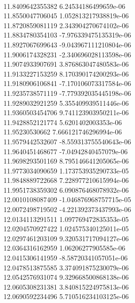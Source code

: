 { \\
11.8409642355382 6.24534186499659e-06
 \\
11.8550047706045 1.052813217938819e-06
 \\
11.8720859081119 2.343904270674102e-06
 \\
11.8834780354103 -7.976339475135319e-06
 \\
11.8927067699643 -9.043967111210804e-06
 \\
11.9006174328231 -2.340696028113598e-06
 \\
11.9074933907691 3.876863047480583e-06
 \\
11.9133227153259 8.170390174200293e-06
 \\
11.9180906106841 -7.170106073317584e-06
 \\
11.9235738571119 -7.779392035445198e-06
 \\
11.9289032921259 5.355409939511446e-06
 \\
11.9360503454706 9.741123903950211e-06
 \\
11.9428852121774 5.6201402003353e-06
 \\
11.95230530662 7.666121746296994e-06
 \\
11.9579442532607 -8.559313755540643e-06
 \\
11.9640451468677 -7.04942840457079e-06
 \\
11.9698293501169 8.795146641205065e-06
 \\
11.9773034090659 1.173753935290733e-05
 \\
11.9848889722668 7.228977210615994e-06
 \\
11.9951738359302 6.090876468078932e-06
 \\
12.0010108087409 -1.046876968757715e-05
 \\
12.0072498719502 -4.221392373437993e-06
 \\
12.0134113291511 1.097769472835353e-05
 \\
12.0204570927422 1.024575340125011e-05
 \\
12.0297461203109 9.320531717094127e-06
 \\
12.0364316162959 1.06206277905585e-06
 \\
12.0415306141959 -8.58720341057051e-06
 \\
12.0478513875585 3.374091875230079e-06
 \\
12.0542576931074 9.329668500868138e-06
 \\
12.0605308231381 3.840815224975813e-06
 \\
12.0690592234496 5.710516234103125e-06
 \\
}

